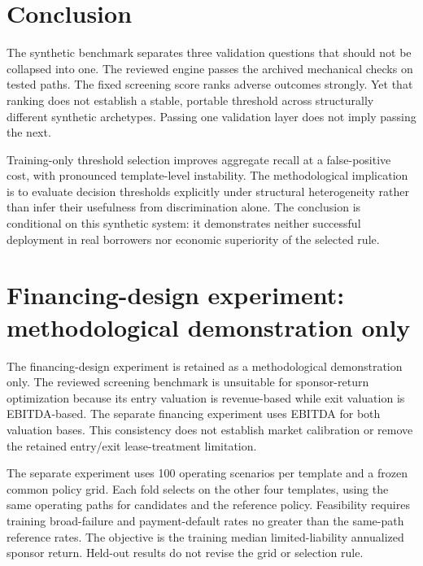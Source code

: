 \documentclass[11pt,a4paper]{article}
\begin{document}
\section{Conclusion}
The synthetic benchmark separates three validation questions that should not be collapsed into one. The reviewed engine passes the archived mechanical checks on tested paths. The fixed screening score ranks adverse outcomes strongly. Yet that ranking does not establish a stable, portable threshold across structurally different synthetic archetypes. Passing one validation layer does not imply passing the next.

Training-only threshold selection improves aggregate recall at a false-positive cost, with pronounced template-level instability. The methodological implication is to evaluate decision thresholds explicitly under structural heterogeneity rather than infer their usefulness from discrimination alone. The conclusion is conditional on this synthetic system: it demonstrates neither successful deployment in real borrowers nor economic superiority of the selected rule.
\clearpage
\appendix
\setcounter{table}{0}\renewcommand{\thetable}{A\arabic{table}}
\setcounter{figure}{0}\renewcommand{\thefigure}{A\arabic{figure}}
\renewcommand{\theHtable}{appendix.\arabic{table}}
\renewcommand{\theHfigure}{appendix.\arabic{figure}}
\section{Financing-design experiment: methodological demonstration only}\label{sec:financing}
The financing-design experiment is retained as a methodological demonstration only. The reviewed screening benchmark is unsuitable for sponsor-return optimization because its entry valuation is revenue-based while exit valuation is EBITDA-based. The separate financing experiment uses EBITDA for both valuation bases. This consistency does not establish market calibration or remove the retained entry/exit lease-treatment limitation.

The separate experiment uses 100 operating scenarios per template and a frozen common policy grid. Each fold selects on the other four templates, using the same operating paths for candidates and the reference policy. Feasibility requires training broad-failure and payment-default rates no greater than the same-path reference rates. The objective is the training median limited-liability annualized sponsor return. Held-out results do not revise the grid or selection rule.
\end{document}

